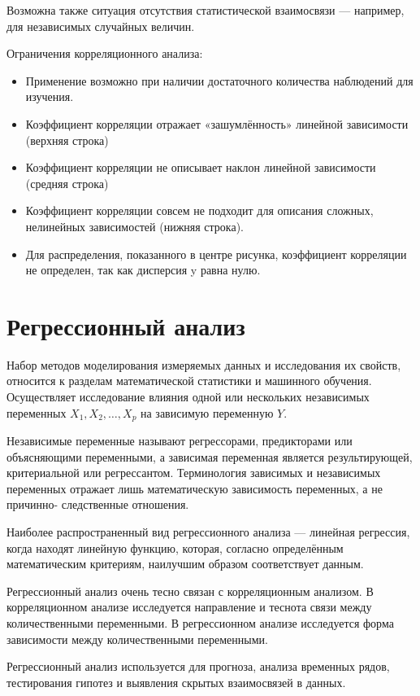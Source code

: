 Возможна также ситуация отсутствия статистической
взаимосвязи — например, для независимых случайных
величин.

Ограничения корреляционного анализа:
\begin{itemize}[label*=---]
	\item Применение возможно при наличии достаточного количества наблюдений для
	изучения.
	\item Коэффициент корреляции отражает «зашумлённость» линейной зависимости
	(верхняя строка)
	\item Коэффициент корреляции не описывает наклон линейной зависимости
	(средняя строка)
	\item Коэффициент корреляции совсем не подходит для описания сложных,
	нелинейных зависимостей (нижняя строка).
	\item Для распределения, показанного в центре рисунка, коэффициент корреляции не
	определен, так как дисперсия y равна нулю.
\end{itemize}


\section{Регрессионный анализ}

Набор методов моделирования измеряемых данных и исследования
их свойств, относится к разделам математической статистики и
машинного обучения. Осуществляет исследование влияния одной или
нескольких независимых переменных $X_1, X_2, …, X_p$ на зависимую
переменную $Y$.

Независимые переменные называют регрессорами, предикторами
или объясняющими переменными, а зависимая переменная является
результирующей, критериальной или регрессантом. Терминология
зависимых и независимых переменных отражает лишь
математическую зависимость переменных, а не причинно-
следственные отношения.

Наиболее распространенный вид регрессионного анализа —
линейная регрессия, когда находят линейную функцию, которая, согласно
определённым математическим критериям, наилучшим образом
соответствует данным.

Регрессионный анализ очень тесно связан с корреляционным
анализом. В корреляционном анализе исследуется направление и
теснота связи между количественными переменными. В регрессионном
анализе исследуется форма зависимости между количественными
переменными.

Регрессионный анализ используется для прогноза, анализа
временных рядов, тестирования гипотез и выявления скрытых
взаимосвязей в данных.



\clearpage

